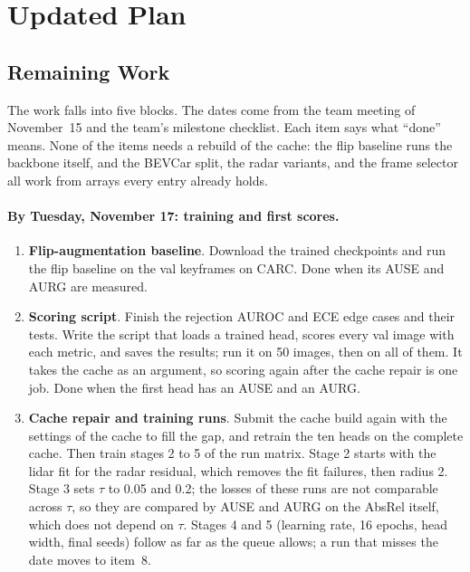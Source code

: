 \section{Updated Plan}
\label{sec:plan}

\subsection{Remaining Work}

The work falls into five blocks. The dates come from the team meeting of November~15 and the team's milestone checklist. Each item says what ``done'' means. None of the items needs a rebuild of the cache: the flip baseline runs the backbone itself, and the BEVCar split, the radar variants, and the frame selector all work from arrays every entry already holds.

\paragraph{By Tuesday, November 17: training and first scores.}
\begin{enumerate}[leftmargin=*, itemsep=2pt, topsep=2pt]
  \item \textbf{Flip-augmentation baseline}. Download the trained checkpoints and run the flip baseline on the val keyframes on CARC. Done when its AUSE and AURG are measured.
  \item \textbf{Scoring script}. Finish the rejection AUROC and ECE edge cases and their tests. Write the script that loads a trained head, scores every val image with each metric, and saves the results; run it on 50 images, then on all of them. It takes the cache as an argument, so scoring again after the cache repair is one job. Done when the first head has an AUSE and an AURG.
  \item \textbf{Cache repair and training runs}. Submit the cache build again with the settings of the cache to fill the gap, and retrain the ten heads on the complete cache. Then train stages 2 to 5 of the run matrix. Stage 2 starts with the lidar fit for the radar residual, which removes the fit failures, then radius 2. Stage 3 sets $\tau$ to 0.05 and 0.2; the losses of these runs are not comparable across $\tau$, so they are compared by AUSE and AURG on the AbsRel itself, which does not depend on $\tau$. Stages 4 and 5 (learning rate, 16 epochs, head width, final seeds) follow as far as the queue allows; a run that misses the date moves to item~8.
\end{enumerate}


